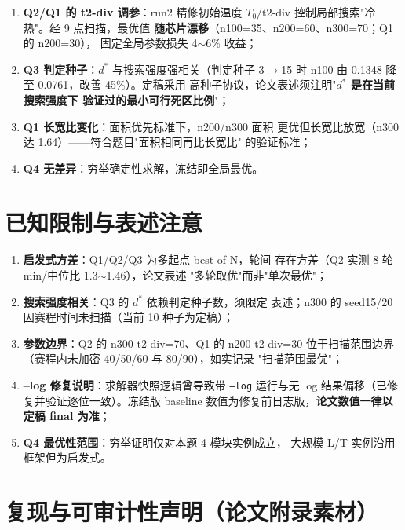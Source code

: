 \documentclass[12pt,a4paper]{article}
\begin{document}
\begin{enumerate}
    \item \textbf{Q2/Q1 的 t2-div 调参}：run2 精修初始温度
    $T_0/\text{t2-div}$ 控制局部搜索"冷热"。经 9 点扫描，最优值
    \textbf{随芯片漂移}（n100=35、n200=60、n300=70；Q1 的 n200=30），
    固定全局参数损失 4$\sim$6\% 收益；
    \item \textbf{Q3 判定种子}：$d^*$ 与搜索强度强相关（判定种子
    3$\to$15 时 n100 由 0.1348 降至 0.0761，改善 45\%）。定稿采用
    高种子协议，论文表述须注明"\textbf{$d^*$ 是在当前搜索强度下
    验证过的最小可行死区比例}"；
    \item \textbf{Q1 长宽比变化}：面积优先标准下，n200/n300 面积
    更优但长宽比放宽（n300 达 1.64）——符合题目"面积相同再比长宽比"
    的验证标准；
    \item \textbf{Q4 无差异}：穷举确定性求解，冻结即全局最优。
\end{enumerate}

\section{已知限制与表述注意}
\label{sec:limits}

\begin{enumerate}
    \item \textbf{启发式方差}：Q1/Q2/Q3 为多起点 best-of-N，轮间
    存在方差（Q2 实测 8 轮 min/中位比 1.3$\sim$1.46），论文表述
    "多轮取优"而非"单次最优"；
    \item \textbf{搜索强度相关}：Q3 的 $d^*$ 依赖判定种子数，须限定
    表述；n300 的 seed15/20 因赛程时间未扫描（当前 10 种子为定稿）；
    \item \textbf{参数边界}：Q2 的 n300 t2-div=70、Q1 的 n200 t2-div=30
    位于扫描范围边界（赛程内未加密 40/50/60 与 80/90），如实记录
    "扫描范围最优"；
    \item \textbf{--log 修复说明}：求解器快照逻辑曾导致带 \texttt{--log}
    运行与无 log 结果偏移（已修复并验证逐位一致）。冻结版 baseline
    数值为修复前日志版，\textbf{论文数值一律以定稿 final 为准}；
    \item \textbf{Q4 最优性范围}：穷举证明仅对本题 4 模块实例成立，
    大规模 L/T 实例沿用框架但为启发式。
\end{enumerate}

\section{复现与可审计性声明（论文附录素材）}
\end{document}
